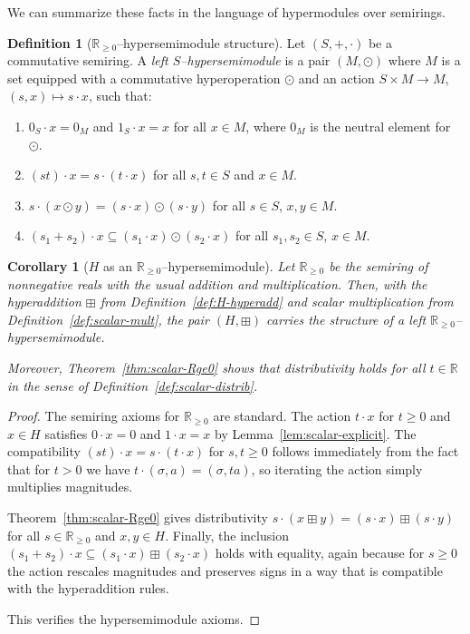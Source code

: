 \documentclass[11pt]{amsart}
\numberwithin{equation}{section}
\newtheorem{corollary}[theorem]{Corollary}
\theoremstyle{definition}
\newtheorem{definition}[theorem]{Definition}
\theoremstyle{remark}
\newcommand{\R}{\mathbb{R}}
\newcommand{\Hnum}{H}                      %
\newcommand{\op}{\boxplus}                 %
\begin{document}
We can summarize these facts in the language of hypermodules over
semirings.

\begin{definition}[$\R_{\ge0}$--hypersemimodule structure]
\label{def:Rge0-hypersemimodule}
Let $(S,+,\cdot)$ be a commutative semiring.  A \emph{left
$S$--hypersemimodule} is a pair $(M,\odot)$ where $M$ is a set equipped
with a commutative hyperoperation $\odot$ and an action
$S\times M\to M$, $(s,x)\mapsto s\cdot x$, such that:
\begin{enumerate}
  \item $0_S\cdot x = 0_M$ and $1_S\cdot x = x$ for all $x\in M$,
        where $0_M$ is the neutral element for $\odot$.
  \item $(st)\cdot x = s\cdot(t\cdot x)$ for all $s,t\in S$ and
        $x\in M$.
  \item $s\cdot(x\odot y) = (s\cdot x)\odot(s\cdot y)$ for all
        $s\in S$, $x,y\in M$.
  \item $(s_1+s_2)\cdot x \subseteq (s_1\cdot x)\odot(s_2\cdot x)$
        for all $s_1,s_2\in S$, $x\in M$.
\end{enumerate}
\end{definition}

\begin{corollary}[$\Hnum$ as an $\R_{\ge0}$--hypersemimodule]
\label{cor:H-Rge0-hypersemimodule}
Let $\R_{\ge0}$ be the semiring of nonnegative reals with the usual
addition and multiplication.  Then, with the hyperaddition $\op$ from
Definition~\ref{def:H-hyperadd} and scalar multiplication from
Definition~\ref{def:scalar-mult}, the pair $(\Hnum,\op)$ carries the
structure of a left $\R_{\ge0}$--hypersemimodule.

Moreover, Theorem~\ref{thm:scalar-Rge0} shows that distributivity holds for all $t\in\R$ in the sense of Definition~\ref{def:scalar-distrib}.
\end{corollary}

\begin{proof}
The semiring axioms for $\R_{\ge0}$ are standard.  The action
$t\cdot x$ for $t\ge0$ and $x\in\Hnum$ satisfies
$0\cdot x=0$ and $1\cdot x=x$ by Lemma~\ref{lem:scalar-explicit}.  The
compatibility $(st)\cdot x = s\cdot(t\cdot x)$ for $s,t\ge0$ follows
immediately from the fact that for $t>0$ we have
$t\cdot(\sigma,a)=(\sigma,ta)$, so iterating the action simply
multiplies magnitudes.

Theorem~\ref{thm:scalar-Rge0} gives distributivity
$s\cdot(x\op y)=(s\cdot x)\op(s\cdot y)$ for all $s\in\R_{\ge0}$ and
$x,y\in\Hnum$.  Finally, the inclusion
$(s_1+s_2)\cdot x \subseteq (s_1\cdot x)\op(s_2\cdot x)$ holds with
equality, again because for $s\ge0$ the action rescales magnitudes and
preserves signs in a way that is compatible with the hyperaddition
rules.

This verifies the hypersemimodule axioms.
\end{proof}
\end{document}
